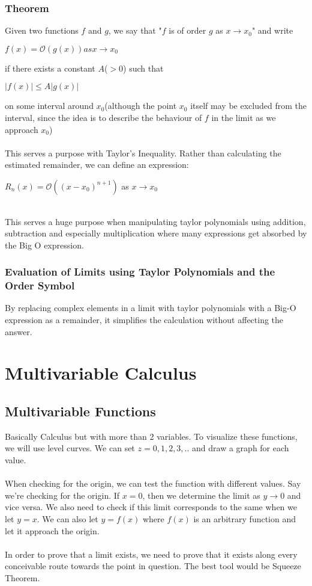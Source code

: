 \documentclass[12pt]{report}
\begin{document}
		\subsection{Theorem}
			Given two functions $f$ and $g$, we say that "$f$ is of order $g$ as $x \rightarrow x_0$" and write \\
			\centerline{$f(x) = \mathcal{O}(g(x)) as x \rightarrow x_0$}
			if there exists a constant $A$($> 0$) such that \\
			\centerline{$|f(x)| \leq A|g(x)|$}
			on some interval around $x_0$(although the point $x_0$ itself may be excluded from the interval, since the idea is to describe the behaviour of $f$ in the limit as we approach $x_0$)
			\\
			\\
			This serves a purpose with Taylor's Inequality. Rather than calculating the estimated remainder, we can define an expression:\\
			\centerline{$R_n(x) = \mathcal{O} ((x-x_0)^{n+1})$ as $x \rightarrow x_0$}\\
			This serves a huge purpose when manipulating taylor polynomials using addition, subtraction and especially multiplication where many expressions get absorbed by the Big O expression.
		\subsection{Evaluation of Limits using Taylor Polynomials and the Order Symbol}
			By replacing complex elements in a limit with taylor polynomials with a Big-O expression as a remainder, it simplifies the calculation without affecting the answer.
\chapter{Multivariable Calculus}
	\section{Multivariable Functions}
		Basically Calculus but with more than 2 variables. To visualize these functions, we will use level curves. We can set $z=0,1,2,3,..$ and draw a graph for each value.\\
		\\
		When checking for the origin, we can test the function with different values. Say we're checking for the origin. If $x=0$, then we determine the limit as $y \rightarrow 0$ and vice versa. We also need to check if this limit corresponds to the same when we let $y = x$. We can also let $y = f(x)$ where $f(x)$ is an arbitrary function and let it approach the origin.\\
		\\
		In order to prove that a limit exists, we need to prove that it exists along every conceivable route towards the point in question. The best tool would be Squeeze Theorem.
\end{document}
